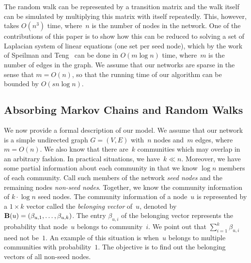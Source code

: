 The random walk can be represented by a transition matrix and the walk itself can be simulated 
by multiplying this matrix with itself repeatedly. This, however, takes $O(n^3)$
time, where~$n$ is the number of nodes in the network. One of the contributions of 
this paper is to show how this can be reduced to solving a set of Laplacian system 
of linear equations (one set per seed node), which by the work of Speilman and 
Teng~\cite{Vis13} can be done in $O(m \log n)$ time, where~$m$ is the number of edges
in the graph. We assume that our networks are sparse in the sense that $m = O(n)$, 
so that the running time of our algorithm can  be bounded by $O(s n \log n)$.    
        
\subsection{Absorbing Markov Chains and Random Walks}
We now provide a formal description of our model. We assume that our network 
is a simple undirected graph $G = (V,E)$ with~$n$ nodes and~$m$ edges, where $m = O(n)$.
We also know that there are~$k$ communities which may overlap in an arbitrary fashion.
In practical situations, we have~$k \ll n$. 
Moreover, we have some partial information about each community in that we know
$\log n$ members of each community. Call such members of the network \emph{seed nodes} and the remaining 
nodes \emph{non-seed nodes}. Together, we know the community information of $k \cdot \log n$ seed nodes. 
The community information of a node~$u$ is represented by a $1 \times k$ vector called the \emph{belonging vector} 
of~$u$, denoted by~$\mathbf{B} (u) = (\beta_{u, 1}, \ldots, \beta_{u, k})$. The entry $\beta_{u, i}$ 
of the belonging vector represents the probability that node~$u$ belongs to community~$i$.  
We point out that $\sum_{i = 1}^k \beta_{u, i}$ need not be~$1$. An example of this situation 
is when~$u$ belongs to multiple communities with probability~$1$.
The objective is to find out the belonging vectors of all non-seed nodes. 

